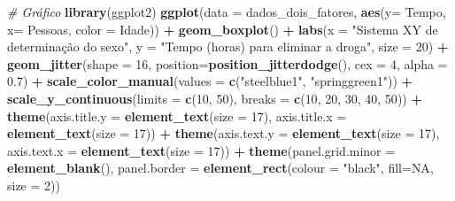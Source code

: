 \documentclass[
]{book}
\newenvironment{Shaded}{\begin{snugshade}}{\end{snugshade}}
\newcommand{\CommentTok}[1]{\textcolor[rgb]{0.56,0.35,0.01}{\textit{#1}}}
\newcommand{\DataTypeTok}[1]{\textcolor[rgb]{0.13,0.29,0.53}{#1}}
\newcommand{\DecValTok}[1]{\textcolor[rgb]{0.00,0.00,0.81}{#1}}
\newcommand{\FloatTok}[1]{\textcolor[rgb]{0.00,0.00,0.81}{#1}}
\newcommand{\KeywordTok}[1]{\textcolor[rgb]{0.13,0.29,0.53}{\textbf{#1}}}
\newcommand{\NormalTok}[1]{#1}
\newcommand{\OperatorTok}[1]{\textcolor[rgb]{0.81,0.36,0.00}{\textbf{#1}}}
\newcommand{\OtherTok}[1]{\textcolor[rgb]{0.56,0.35,0.01}{#1}}
\newcommand{\StringTok}[1]{\textcolor[rgb]{0.31,0.60,0.02}{#1}}
\begin{document}
\begin{Shaded}
\begin{Highlighting}[]
\CommentTok{# Gráfico}
\KeywordTok{library}\NormalTok{(ggplot2)}
\KeywordTok{ggplot}\NormalTok{(}\DataTypeTok{data =}\NormalTok{ dados_dois_fatores, }\KeywordTok{aes}\NormalTok{(}\DataTypeTok{y=}\NormalTok{ Tempo, }\DataTypeTok{x=}\NormalTok{ Pessoas, }\DataTypeTok{color =}\NormalTok{ Idade)) }\OperatorTok{+}\StringTok{ }
\StringTok{  }\KeywordTok{geom_boxplot}\NormalTok{() }\OperatorTok{+}
\StringTok{  }\KeywordTok{labs}\NormalTok{(}\DataTypeTok{x =} \StringTok{"Sistema XY de determinação do sexo"}\NormalTok{, }\DataTypeTok{y =} \StringTok{"Tempo (horas) para eliminar a droga"}\NormalTok{, }
       \DataTypeTok{size =} \DecValTok{20}\NormalTok{) }\OperatorTok{+}
\StringTok{  }\KeywordTok{geom_jitter}\NormalTok{(}\DataTypeTok{shape =} \DecValTok{16}\NormalTok{, }\DataTypeTok{position=}\KeywordTok{position_jitterdodge}\NormalTok{(), }\DataTypeTok{cex =} \DecValTok{4}\NormalTok{, }\DataTypeTok{alpha =} \FloatTok{0.7}\NormalTok{) }\OperatorTok{+}
\StringTok{  }\KeywordTok{scale_color_manual}\NormalTok{(}\DataTypeTok{values =} \KeywordTok{c}\NormalTok{(}\StringTok{"steelblue1"}\NormalTok{, }\StringTok{"springgreen1"}\NormalTok{)) }\OperatorTok{+}
\StringTok{  }\KeywordTok{scale_y_continuous}\NormalTok{(}\DataTypeTok{limits =} \KeywordTok{c}\NormalTok{(}\DecValTok{10}\NormalTok{, }\DecValTok{50}\NormalTok{), }\DataTypeTok{breaks =} \KeywordTok{c}\NormalTok{(}\DecValTok{10}\NormalTok{, }\DecValTok{20}\NormalTok{, }\DecValTok{30}\NormalTok{, }\DecValTok{40}\NormalTok{, }\DecValTok{50}\NormalTok{)) }\OperatorTok{+}
\StringTok{  }\KeywordTok{theme}\NormalTok{(}\DataTypeTok{axis.title.y =} \KeywordTok{element_text}\NormalTok{(}\DataTypeTok{size =} \DecValTok{17}\NormalTok{), }\DataTypeTok{axis.title.x =} \KeywordTok{element_text}\NormalTok{(}\DataTypeTok{size =} \DecValTok{17}\NormalTok{)) }\OperatorTok{+}
\StringTok{  }\KeywordTok{theme}\NormalTok{(}\DataTypeTok{axis.text.y =} \KeywordTok{element_text}\NormalTok{(}\DataTypeTok{size =} \DecValTok{17}\NormalTok{), }\DataTypeTok{axis.text.x =} \KeywordTok{element_text}\NormalTok{(}\DataTypeTok{size =} \DecValTok{17}\NormalTok{)) }\OperatorTok{+}
\StringTok{  }\KeywordTok{theme}\NormalTok{(}\DataTypeTok{panel.grid.minor =} \KeywordTok{element_blank}\NormalTok{(), }
        \DataTypeTok{panel.border =} \KeywordTok{element_rect}\NormalTok{(}\DataTypeTok{colour =} \StringTok{"black"}\NormalTok{, }\DataTypeTok{fill=}\OtherTok{NA}\NormalTok{, }\DataTypeTok{size =} \DecValTok{2}\NormalTok{)) }
\end{Highlighting}
\end{Shaded}
\end{document}
